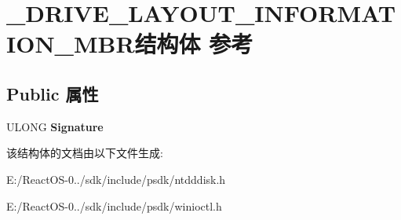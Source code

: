 \hypertarget{struct___d_r_i_v_e___l_a_y_o_u_t___i_n_f_o_r_m_a_t_i_o_n___m_b_r}{}\section{\+\_\+\+D\+R\+I\+V\+E\+\_\+\+L\+A\+Y\+O\+U\+T\+\_\+\+I\+N\+F\+O\+R\+M\+A\+T\+I\+O\+N\+\_\+\+M\+B\+R结构体 参考}
\label{struct___d_r_i_v_e___l_a_y_o_u_t___i_n_f_o_r_m_a_t_i_o_n___m_b_r}
\subsection*{Public 属性}
\begin{DoxyCompactItemize}
\item 
\mbox{\label{struct___d_r_i_v_e___l_a_y_o_u_t___i_n_f_o_r_m_a_t_i_o_n___m_b_r_ac3cb2c3ce1146b6822e53a5cdab6aab7}} 
U\+L\+O\+NG {\bfseries Signature}
\end{DoxyCompactItemize}


该结构体的文档由以下文件生成\+:\begin{DoxyCompactItemize}
\item 
E\+:/\+React\+O\+S-\/0../sdk/include/psdk/ntdddisk.\+h\item 
E\+:/\+React\+O\+S-\/0../sdk/include/psdk/winioctl.\+h\end{DoxyCompactItemize}
